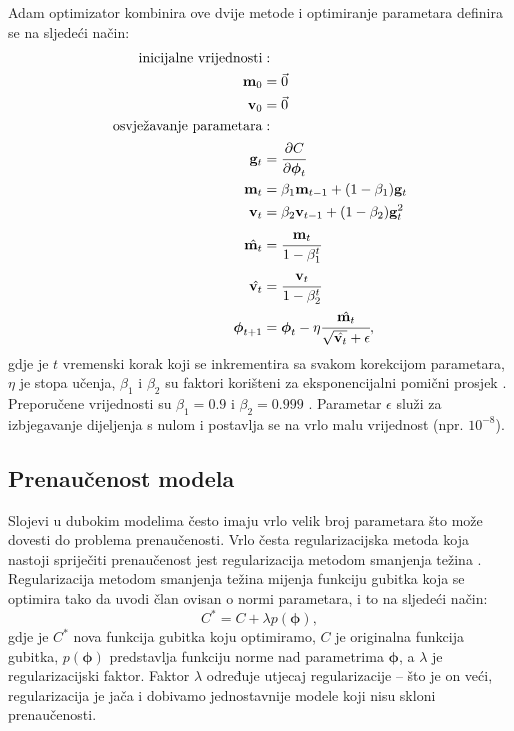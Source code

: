 \documentclass[times, utf8, diplomski, numeric]{fer}
\begin{document}
Adam optimizator kombinira ove dvije metode i optimiranje parametara definira se na sljedeći način:
\begin{align}
 \text{inicijalne vrijednosti}&: \\
 \mathbf{m}_0 &= \vec{0} \nonumber \\
 \mathbf{v}_0 &= \vec{0} \nonumber  \\
 \text{osvježavanje parametara}&: \\
 \mathbf{g}_t &= \cfrac{\partial C}{\partial \boldsymbol{\phi}_t}  \nonumber \\
 \mathbf{m}_t &= \beta_1 \mathbf{m}_{t-1} + (1 - \beta_1) \mathbf{g}_t \nonumber \\
 \mathbf{v}_t &= \beta_2 \mathbf{v}_{t-1} + (1 - \beta_2) \mathbf{g}_t^2 \nonumber \\
 \hat{\mathbf{m}_t} &= \cfrac{\mathbf{m}_t}{1 - \beta_1^t} \nonumber \\
 \hat{\mathbf{v}_t} &= \cfrac{\mathbf{v}_t}{1 - \beta_2^t} \nonumber \\
 \boldsymbol{\phi}_{t+1} &= \boldsymbol{\phi}_t - \eta \cfrac{\hat{\mathbf{m}_t}}{\sqrt{\hat{\mathbf{v}_t}} + \epsilon} \nonumber,
\end{align}
gdje je $t$ vremenski korak koji se inkrementira sa svakom korekcijom parametara, $\eta$ je stopa učenja, $\beta_1$ i $\beta_2$ su faktori korišteni za
eksponencijalni pomični prosjek . Preporučene vrijednosti su $\beta_1=0.9$ i $\beta_2=0.999$ \citep{article:adam}.
Parametar $\epsilon$ služi za izbjegavanje dijeljenja s nulom i postavlja se na vrlo malu vrijednost (npr. $10^{-8}$).


\subsection{Prenaučenost modela}

Slojevi u dubokim modelima često imaju vrlo velik broj parametara što može dovesti do problema prenaučenosti.
Vrlo česta regularizacijska metoda koja nastoji spriječiti prenaučenost jest regularizacija metodom smanjenja težina .
Regularizacija metodom smanjenja težina mijenja funkciju gubitka koja se optimira tako da uvodi član ovisan o normi parametara, i to na sljedeći način:
\begin{equation}
 C^* = C + \lambda p(\boldsymbol{\phi}),
\end{equation}
gdje je $C^*$ nova funkcija gubitka koju optimiramo, $C$ je originalna funkcija gubitka, $p(\boldsymbol{\phi})$ predstavlja funkciju norme nad parametrima $\boldsymbol{\phi}$, a $\lambda$ je regularizacijski faktor.
Faktor $\lambda$ određuje utjecaj regularizacije -- što je on veći, regularizacija je jača i dobivamo jednostavnije modele koji nisu skloni prenaučenosti.
\end{document}
